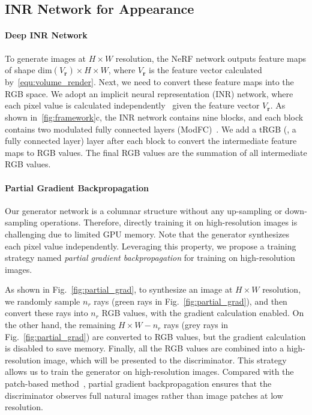 \documentclass[10pt,twocolumn,letterpaper]{article}
\begin{document}
\subsection{INR Network for Appearance}
\label{sec:deep_inr}

\paragraph{Deep INR Network}
To generate images at $H\times W$ resolution, the NeRF network outputs feature maps of shape $\mathrm{dim}(V_\mathbf{r}) \times H \times W$, where $V_\mathbf{r}$ is the feature vector calculated by~\cref{equ:volume_render}. Next, we need to convert these feature maps into the RGB space. We adopt an implicit neural representation (INR) network, where each pixel value is calculated independently~\cite{anokhin2021Image} given the feature vector $V_\mathbf{r}$. As shown in~\cref{fig:framework}c, the INR network contains nine blocks, and each block contains two modulated fully connected layers (ModFC)~\cite{karras2019Analyzing,anokhin2021Image}. We add a tRGB (\ie, a fully connected layer) layer after each block to convert the intermediate feature maps to RGB values. The final RGB values are the summation of all intermediate RGB values.


\paragraph{Partial Gradient Backpropagation}
\label{sec:partial_gradient}
Our generator network is a columnar structure without any up-sampling or down-sampling operations. Therefore, directly training it on high-resolution images is challenging due to limited GPU memory. Note that the generator synthesizes each pixel value independently. Leveraging this property, we propose a training strategy named \textit{partial gradient backpropagation} for training on high-resolution images.

As shown in Fig.~\ref{fig:partial_grad}, to synthesize an image at $H\times W$ resolution, we randomly sample $n_r$ rays (green rays in Fig.~\ref{fig:partial_grad}), and then convert these rays into $n_r$ RGB values, with the gradient calculation enabled. On the other hand, the remaining $H\times W - n_r$ rays (grey rays in Fig.~\ref{fig:partial_grad}) are converted to RGB values, but the gradient calculation is disabled to save memory. Finally, all the RGB values are combined into a high-resolution image, which will be presented to the discriminator. This strategy allows us to train the generator on high-resolution images. Compared with the patch-based method~\cite{schwarz2020GRAF,anokhin2021Image}, partial gradient backpropagation ensures that the discriminator observes full natural images rather than image patches at low resolution.
\end{document}
